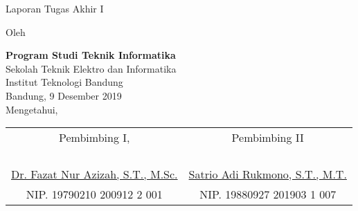\clearpage
\pagestyle{empty}

\begin{center}
\smallskip

    \Large \bfseries \MakeUppercase{\thetitle}
    \vfill

    \Large Laporan Tugas Akhir I
    \vfill

    \large Oleh

    \Large \theauthor

    \normalsize
    \textbf{Program Studi Teknik Informatika} \\
    Sekolah Teknik Elektro dan Informatika \\
    Institut Teknologi Bandung \\

    \vfill
    \normalsize \normalfont
    Bandung, 9 Desember 2019 \\
    Mengetahui,

    \vfill
    \setlength{\tabcolsep}{12pt}
    \begin{tabular}{c@{\hskip 0.5in}c}
        Pembimbing I, & Pembimbing II \\
        & \\
        & \\
        & \\
        & \\
        \underline{Dr. Fazat Nur Azizah, S.T., M.Sc.} & \underline{Satrio Adi Rukmono, S.T., M.T.} \\
        NIP. 19790210 200912 2 001 & NIP. 19880927 201903 1 007 \\
    \end{tabular}

\end{center}
\clearpage
